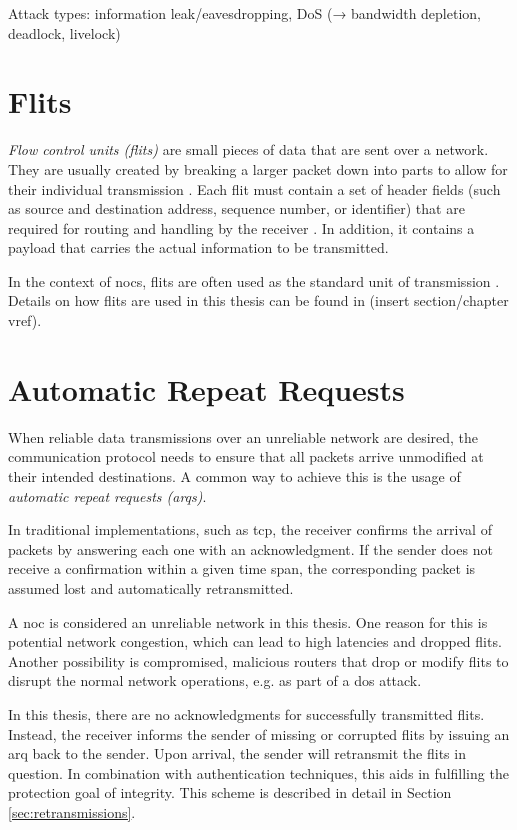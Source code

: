 Attack types: information leak/eavesdropping, DoS (→ bandwidth depletion, deadlock, livelock)

\section{Flits}\label{sec:flits}
\textit{Flow control units (flits)} are small pieces of data that are sent over a network. They are usually created by breaking a larger
packet down into parts to allow for their individual transmission \cite[6]{flitslecturecmu}. Each flit must contain a set of header fields (such as source and
destination address, sequence number, or identifier) that are required for routing and handling by the receiver \cite[2]{flitslectureutah}.
In addition, it contains a payload that carries the actual information to be transmitted.

In the context of \glspl{noc}, flits are often used as the standard unit of transmission \cite[51\psqq]{tatas16designingnocs}. Details on how flits
are used in this thesis can be found in (insert section/chapter vref).

\section{Automatic Repeat Requests}\label{sec:arqs}
When reliable data transmissions over an unreliable network are desired, the communication protocol needs to ensure that all packets arrive unmodified
at their intended destinations. A common way to achieve this is the usage of \textit{automatic repeat requests (\glspl{arq})}.

In traditional implementations, such as \gls{tcp}, the receiver confirms the arrival of packets by answering each one with an acknowledgment.
If the sender does not receive a confirmation within a given time span, the corresponding packet is assumed lost and automatically retransmitted.

A \gls{noc} is considered an unreliable network in this thesis. One reason for this is potential network congestion, which can lead to high latencies
and dropped flits. Another possibility is compromised, malicious routers that drop or modify flits to disrupt the normal network operations, e.g. as part of a
\gls{dos} attack.

In this thesis, there are no acknowledgments for successfully transmitted flits. Instead, the receiver informs the sender of missing or corrupted
flits by issuing an \gls{arq} back to the sender. Upon arrival, the sender will retransmit the flits in question. In combination with
authentication techniques, this aids in fulfilling the protection goal of integrity. This scheme is described in detail in Section
\ref{sec:retransmissions}.

